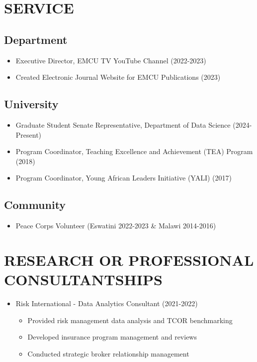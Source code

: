 \documentclass[11pt,letterpaper]{article}
\begin{document}
\section{SERVICE}

\subsection*{Department}
\begin{itemize}
    \item Executive Director, EMCU TV YouTube Channel (2022-2023)
    \item Created Electronic Journal Website for EMCU Publications (2023)
\end{itemize}

\subsection*{University}
\begin{itemize}
    \item Graduate Student Senate Representative, Department of Data Science (2024-Present)
    \item Program Coordinator, Teaching Excellence and Achievement (TEA) Program (2018)
    \item Program Coordinator, Young African Leaders Initiative (YALI) (2017)
\end{itemize}

\subsection*{Community}
\begin{itemize}
    \item Peace Corps Volunteer (Eswatini 2022-2023 \& Malawi 2014-2016)
\end{itemize}

\section{RESEARCH OR PROFESSIONAL CONSULTANTSHIPS}
\begin{itemize}
    \item Risk International - Data Analytics Consultant (2021-2022)
    \begin{itemize}
        \item Provided risk management data analysis and TCOR benchmarking
        \item Developed insurance program management and reviews
        \item Conducted strategic broker relationship management
    \end{itemize}
\end{itemize}
\end{document}
